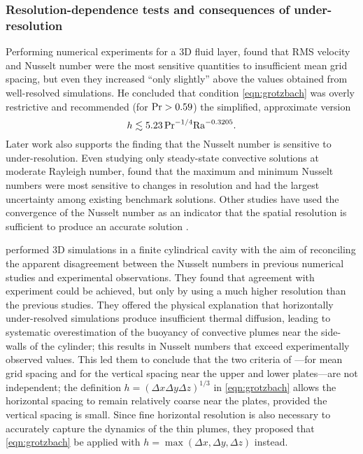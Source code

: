 \documentclass[../main.tex]{subfiles}
\begin{document}
\subsubsection{Resolution-dependence tests and consequences of
    under-resolution}%
\label{sec:res_tests}

Performing numerical experiments for a 3D fluid layer,
\citeauthor{grotzbach1983} found that RMS velocity and Nusselt number were the
most sensitive quantities to insufficient mean grid spacing, but even they
increased ``only slightly'' above the values obtained from well-resolved
simulations. He concluded that condition \cref{eqn:grotzbach} was overly
restrictive and recommended (for $\mathrm{Pr} > 0.59$) the simplified, approximate
version
\[ %
    h \lesssim 5.23 \, \prandtl^{-1/4} \rayleigh^{-0.3205}. \] Later work also
supports the finding that the Nusselt number is sensitive to under-resolution.
Even studying only steady-state convective solutions at moderate Rayleigh
number, \textcite{le_quere1991} found that the maximum and minimum Nusselt
numbers were most sensitive to changes in resolution and had the largest
uncertainty among existing benchmark solutions.
Other studies have used the convergence of the Nusselt number as an indicator
that the spatial resolution is sufficient to produce an accurate solution
\parencite{ouertatani2008}.

\textcite{stevens2010} performed 3D simulations in a finite cylindrical cavity
with the aim of reconciling the apparent disagreement between the Nusselt
numbers in previous numerical studies and experimental observations. They found
that agreement with experiment could be achieved, but only by using a much
higher resolution than the previous studies. They offered the physical
explanation that horizontally under-resolved simulations produce insufficient
thermal diffusion, leading to systematic overestimation of the buoyancy of
convective plumes near the side-walls of the cylinder; this results in Nusselt
numbers that exceed experimentally observed values. This led them to conclude
that the two criteria of \textcite{grotzbach1983}---for mean grid spacing and
for the vertical spacing near the upper and lower plates---are not independent;
the definition $h = (\Delta x \Delta y \Delta z)^{1/3}$ in \cref{eqn:grotzbach}
allows the horizontal spacing to remain relatively coarse near the plates,
provided the vertical spacing is small. Since fine horizontal resolution is
also necessary to accurately capture the dynamics of the thin plumes, they
proposed that \cref{eqn:grotzbach} be applied with $h = \max(\Delta x, \Delta
y, \Delta z)$ instead.
\end{document}
